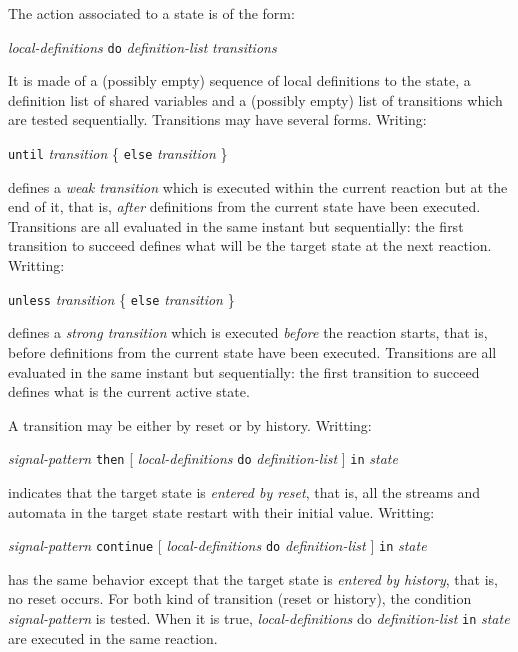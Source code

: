 \documentclass[11pt,titlepage,twoside]{report}
\newcommand{\Then}{\mbox{{\tt then}}}
\newcommand{\Until}{\mbox{\tt until}}
\newcommand{\Unless}{\mbox{\tt unless}}
\newcommand{\Continue}{\mbox{\tt continue}}
\newcommand{\Do}{\mbox{\tt do}}
\newcommand{\term}[1]{{\tt #1}}
\newcommand{\nterm}[1]{{\em #1}}
\begin{document}
The action associated to a state is of the form:
\begin{center}
  \nterm{local-definitions} \term{\Do} \nterm{definition-list} 
  \nterm{transitions}
\end{center}
It is made of a (possibly empty) sequence of local definitions to the
state, a definition list of shared variables and a (possibly empty)
list of transitions which are tested sequentially. Transitions may
have several forms.  Writing:
\begin{center}
  \term{\Until} \nterm{transition} \{ \term{else} \nterm{transition} \}
  \end{center}
defines a {\em weak transition} which is executed within the current reaction
but at the end of it, that is, {\em after} definitions from the current state have
been executed. Transitions are all evaluated in the same instant but
sequentially: the first transition to succeed defines what will be the target
state at the next reaction. Writting:
\begin{center}
  \term{\Unless} \nterm{transition} \{ \term{else} \nterm{transition} \}
\end{center}
defines a {\em strong transition} which is executed {\em before} the
reaction starts, that is, before definitions from the current state
have been executed. Transitions are all evaluated in the same instant
but sequentially: the first transition to succeed defines what is the
current active state.

A transition may be either by reset or by
history. Writting:
\begin{center}
  \nterm{signal-pattern} \term{\Then}
                  [ \nterm{local-definitions} \term{do} \nterm{definition-list} ]
                  \term{in} \nterm{state}
\end{center}
indicates that the target state is {\em entered by reset}, that is, all
the streams and automata in the target state restart with their initial
value.  Writting: 
\begin{center}
  \nterm{signal-pattern} \term{\Continue}
                  [ \nterm{local-definitions} \term{do} \nterm{definition-list} ]
                  \term{in} \nterm{state}
\end{center}
has the same behavior except that the target state is {\em entered by
  history}, that is, no reset occurs. For both kind of transition
(reset or history), the condition \nterm{signal-pattern} is
tested. When it is true, \nterm{local-definitions} do
\nterm{definition-list} \term{in} \nterm{state} are executed in the same reaction.
\end{document}
